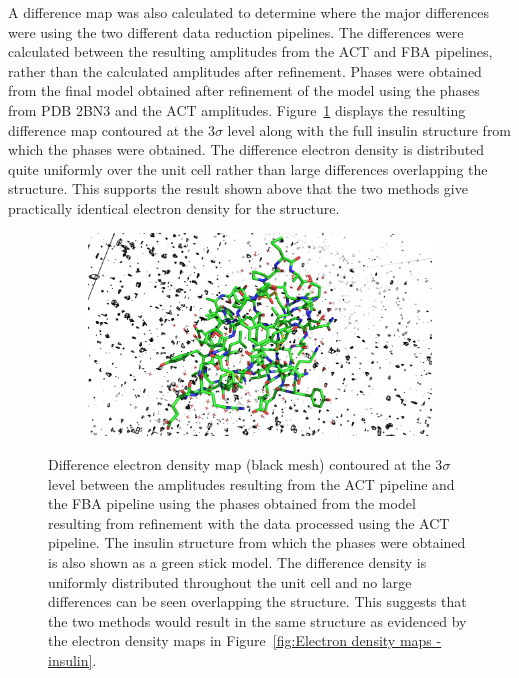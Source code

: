 A difference map was also calculated to determine where the major differences were using the two different data reduction pipelines.
The differences were calculated between the resulting amplitudes from the ACT and FBA pipelines, rather than the calculated amplitudes after refinement.
Phases were obtained from the final model obtained after refinement of the model using the phases from PDB 2BN3 and the ACT amplitudes.
Figure~\ref{fig:Difference electron density map - insulin} displays the resulting difference map contoured at the 3$\sigma$ level along with the full insulin structure from which the phases were obtained.
The difference electron density is distributed quite uniformly over the unit cell rather than large differences overlapping the structure.
This supports the result shown above that the two methods give practically identical electron density for the structure.
\begin{figure}
    \begin{subfigure}[b]{1.0\textwidth}
        \centering
        \includegraphics[width=\textwidth]{figures/datared/diff_aim_fba_insulin_seq_cnvc.png}
    \end{subfigure}
    \caption[Difference electron density map for insulin dataset.]{Difference electron density map (black mesh) contoured at the 3$\sigma$ level between the amplitudes resulting from the ACT pipeline and the FBA pipeline using the phases obtained from the model resulting from refinement with the data processed using the ACT pipeline.
    The insulin structure from which the phases were obtained is also shown as a green stick model.
    The difference density is uniformly distributed throughout the unit cell and no large differences can be seen overlapping the structure.
    This suggests that the two methods would result in the same structure as evidenced by the electron density maps in Figure~\ref{fig:Electron density maps - insulin}.}
    \label{fig:Difference electron density map - insulin}
\end{figure}

